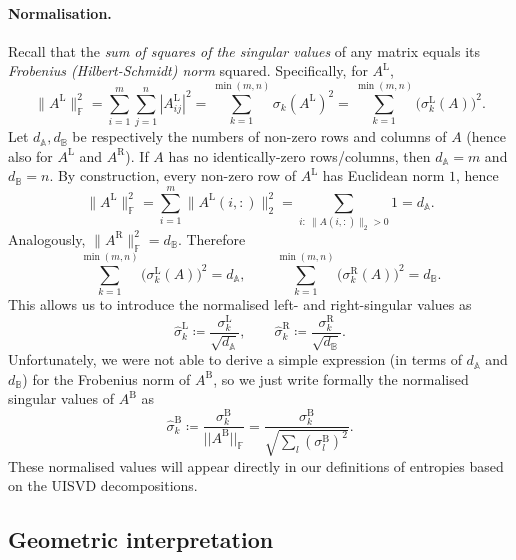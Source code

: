 \documentclass[11pt,a4paper]{article}
\newcommand{\be}{\begin{equation}}
\newcommand{\ee}{\end{equation}}
\begin{document}
\paragraph{Normalisation.}
Recall that the \emph{sum of squares of the singular values} of any matrix equals its \emph{Frobenius (Hilbert-Schmidt) norm} squared. Specifically, for $A^{\mathrm L}$,
\begin{equation}\label{eq:frob-norm-lui}
\|A^{\mathrm L}\|_\mathbb{F}^2
=
\sum_{i=1}^{m}\sum_{j=1}^{n} |A^{\mathrm L}_{ij}|^2
=
\sum_{k=1}^{\min(m,n)} \sigma_k(A^{\mathrm L})^2
=
\sum_{k=1}^{\min(m,n)} \bigl(\sigma_k^{\mathrm L}(A)\bigr)^2.
\end{equation}
Let $d_{\mathbb A}, d_{\mathbb B}$ be respectively the numbers of non-zero rows and columns of $A$ (hence also for $A^\mathrm L$ and $A^\mathrm R$). If $A$ has no identically-zero rows/columns, then $d_{\mathbb A}=m$ and $d_{\mathbb B}=n$. By construction, every non-zero row of $A^{\mathrm L}$ has Euclidean norm $1$, hence
\begin{equation}
\|A^{\mathrm L}\|_\mathbb{F}^2
=
\sum_{i=1}^{m} \|A^{\mathrm L}(i,:)\|_2^2
=
\sum_{i:\ \|A(i,:)\|_2>0} 1
=
d_{\mathbb A}.
\end{equation}
Analogously, $\|A^{\mathrm R}\|_\mathbb{F}^2=d_{\mathbb B}$. Therefore
\begin{equation}
\sum_{k=1}^{\min(m,n)} \bigl(\sigma_k^{\mathrm L}(A)\bigr)^2 = d_{\mathbb A},
\qquad
\sum_{k=1}^{\min(m,n)} \bigl(\sigma_k^{\mathrm R}(A)\bigr)^2 = d_{\mathbb B}.
\end{equation}
This allows us to introduce the normalised left- and right-singular values as
\be\label{eq-normalised-luirui-values}
\hat{\sigma}_k^\mathrm{L}\coloneq \frac{\sigma_k^\mathrm{L}}{\sqrt{d_{\mathbb{A}}}},\qquad \hat{\sigma}_k^\mathrm{R}\coloneq \frac{\sigma_k^\mathrm{R}}{\sqrt{d_{\mathbb{B}}}}.
\ee
Unfortunately, we were not able to derive a simple expression (in terms of $d_\mathbb{A}$ and $d_\mathbb{B}$) for the Frobenius norm of $A^\mathrm{B}$, so we just write formally the normalised singular values of $A^\mathrm{B}$ as
\be
\hat{\sigma}_k^\mathrm{B}\coloneq \frac{\sigma_k^\mathrm{B}}{||A^\mathrm{B}||_\mathbb{F}}=\frac{\sigma_k^\mathrm{B}}{\sqrt{\sum_l(\sigma_l^\mathrm{B})^2}}.\label{NormsingvalAU}
\ee
These normalised values will appear directly in our definitions of entropies based on the UISVD decompositions.
\subsection{Geometric interpretation}
\end{document}
